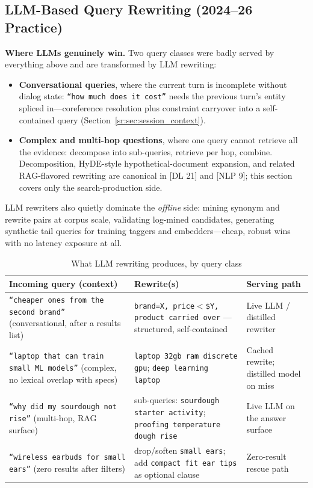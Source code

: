 \subsection{LLM-Based Query Rewriting (2024--26 Practice)}
\label{sr:sec:llm_rewriting}

\textbf{Where LLMs genuinely win.} Two query classes were badly served by everything above and are transformed by LLM rewriting:
\begin{itemize}
    \item \textbf{Conversational queries}, where the current turn is incomplete without dialog state: \texttt{``how much does it cost''} needs the previous turn's entity spliced in---coreference resolution plus constraint carryover into a self-contained query (Section~\ref{sr:sec:session_context}).
    \item \textbf{Complex and multi-hop questions}, where one query cannot retrieve all the evidence: decompose into sub-queries, retrieve per hop, combine. Decomposition, HyDE-style hypothetical-document expansion, and related RAG-flavored rewriting are canonical in [DL 21] and [NLP 9]; this section covers only the search-production side.
\end{itemize}
LLM rewriters also quietly dominate the \textit{offline} side: mining synonym and rewrite pairs at corpus scale, validating log-mined candidates, generating synthetic tail queries for training taggers and embedders---cheap, robust wins with no latency exposure at all.

\begin{table}[H]
\centering
\small
\caption{What LLM rewriting produces, by query class}
\label{sr:tab:llm_rewrites}
\begin{tabularx}{\textwidth}{XXl}
\toprule
\textbf{Incoming query (context)} & \textbf{Rewrite(s)} & \textbf{Serving path} \\
\midrule
\texttt{``cheaper ones from the second brand''} (conversational, after a results list) & \texttt{brand=X, price$<$\$Y, product carried over} --- structured, self-contained & Live LLM / distilled rewriter \\
\texttt{``laptop that can train small ML models''} (complex, no lexical overlap with specs) & \texttt{laptop 32gb ram discrete gpu}; \texttt{deep learning laptop} & Cached rewrite; distilled model on miss \\
\texttt{``why did my sourdough not rise''} (multi-hop, RAG surface) & sub-queries: \texttt{sourdough starter activity}; \texttt{proofing temperature dough rise} & Live LLM on the answer surface \\
\texttt{``wireless earbuds for small ears''} (zero results after filters) & drop/soften \texttt{small ears}; add \texttt{compact fit ear tips} as optional clause & Zero-result rescue path \\
\bottomrule
\end{tabularx}
\end{table}

